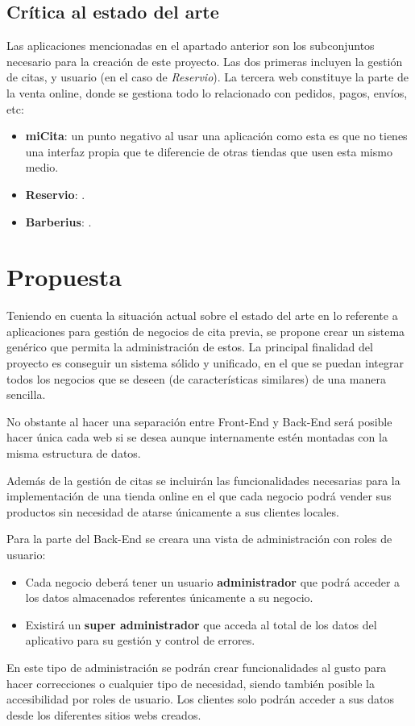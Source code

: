 \subsection{Crítica al estado del arte}

Las aplicaciones mencionadas en el apartado anterior son los subconjuntos necesario para la creación de este proyecto.
Las dos primeras incluyen la gestión de citas, y usuario (en el caso de \textit{Reservio}). La tercera web constituye
la parte de la venta online, donde se gestiona todo lo relacionado con pedidos, pagos, envíos, etc:

\vspace{-0.5em}

\begin{itemize}
    \item \textbf{miCita}: un punto negativo al usar una aplicación como esta es que no tienes una interfaz propia
    que te diferencie de otras tiendas que usen esta mismo medio.

    \item \textbf{Reservio}: .

    \item \textbf{Barberius}: .
\end{itemize}

\section{Propuesta}
Teniendo en cuenta la situación actual sobre el estado del arte en lo referente a aplicaciones para
gestión de negocios de cita previa, se propone crear un sistema genérico que permita la administración
de estos. La principal finalidad del proyecto es conseguir un sistema sólido y unificado, en el que se
puedan integrar todos los negocios que se deseen (de características similares) de una manera sencilla.

No obstante al hacer una separación entre Front-End y Back-End será posible hacer única cada web si se
desea aunque internamente estén montadas con la misma estructura de datos.

Además de la gestión de citas se incluirán las funcionalidades necesarias para la implementación de una
tienda online en el que cada negocio podrá vender sus productos sin necesidad de atarse únicamente
a sus clientes locales.

Para la parte del Back-End se creara una vista de administración con roles de usuario:

\vspace{-0.5em}
\begin{itemize}
    \item Cada negocio deberá tener un usuario \textbf{administrador} que podrá acceder a los datos
    almacenados referentes únicamente a su negocio.

    \item Existirá un \textbf{super administrador} que acceda al total de los datos del aplicativo
    para su gestión y control de errores.
\end{itemize}

En este tipo de administración se podrán crear funcionalidades al gusto para hacer correcciones o
cualquier tipo de necesidad, siendo también posible la accesibilidad por roles de usuario.
Los clientes solo podrán acceder a sus datos desde los diferentes sitios webs creados.